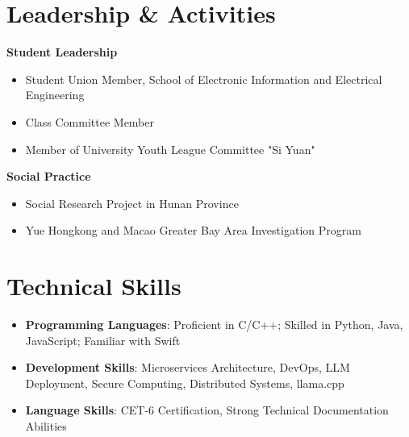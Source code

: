 \documentclass[a4paper]{article}
\begin{document}
\section*{Leadership \& Activities}
\begin{minipage}{0.48\textwidth}
\textbf{Student Leadership}
\begin{itemize}[leftmargin=*,itemsep=0.1em,topsep=0.1em]
\item Student Union Member, School of Electronic Information and Electrical Engineering
\item Class Committee Member
\item Member of University Youth League Committee "Si Yuan"
\end{itemize}
\end{minipage}
\begin{minipage}{0.48\textwidth}
\textbf{Social Practice}
\begin{itemize}[leftmargin=*,itemsep=0.1em,topsep=0.1em]
\item Social Research Project in Hunan Province
\item Yue Hongkong and Macao Greater Bay Area Investigation Program
\end{itemize}
\end{minipage}

\section*{Technical Skills}
\begin{itemize}[leftmargin=*,itemsep=0.2em,topsep=0.2em]
\item \textbf{Programming Languages}: Proficient in C/C++; Skilled in Python, Java, JavaScript; Familiar with Swift
\item \textbf{Development Skills}: Microservices Architecture, DevOps, LLM Deployment, Secure Computing, Distributed Systems, llama.cpp
\item \textbf{Language Skills}: CET-6 Certification, Strong Technical Documentation Abilities
\end{itemize}
\end{document}
